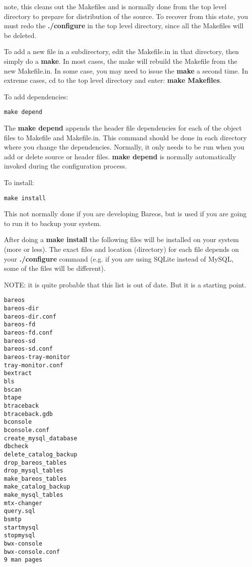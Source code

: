 note, this cleans out the Makefiles and is normally done from the top level
directory to prepare for distribution of the source. To recover from this
state, you must redo the {\bf ./configure} in the top level directory, since
all the Makefiles will be deleted.

To add a new file in a subdirectory, edit the Makefile.in in that directory,
then simply do a {\bf make}. In most cases, the make will rebuild the Makefile
from the new Makefile.in. In some case, you may need to issue the {\bf make} a
second time. In extreme cases, cd to the top level directory and enter: {\bf
make Makefiles}.

To add dependencies:

\footnotesize
\begin{verbatim}
make depend
\end{verbatim}
\normalsize

The {\bf make depend} appends the header file dependencies for each of the
object files to Makefile and Makefile.in. This command should be done in each
directory where you change the dependencies. Normally, it only needs to be run
when you add or delete source or header files. {\bf make depend} is normally
automatically invoked during the configuration process.

To install:

\footnotesize
\begin{verbatim}
make install
\end{verbatim}
\normalsize

This not normally done if you are developing Bareos, but is used if you are
going to run it to backup your system.

After doing a {\bf make install} the following files will be installed on your
system (more or less). The exact files and location (directory) for each file
depends on your {\bf ./configure} command (e.g. if you are using SQLite instead
of MySQL, some of the files will be different).

NOTE: it is quite probable that this list is out of date.  But it is a
starting point.

\footnotesize
\begin{verbatim}
bareos
bareos-dir
bareos-dir.conf
bareos-fd
bareos-fd.conf
bareos-sd
bareos-sd.conf
bareos-tray-monitor
tray-monitor.conf
bextract
bls
bscan
btape
btraceback
btraceback.gdb
bconsole
bconsole.conf
create_mysql_database
dbcheck
delete_catalog_backup
drop_bareos_tables
drop_mysql_tables
make_bareos_tables
make_catalog_backup
make_mysql_tables
mtx-changer
query.sql
bsmtp
startmysql
stopmysql
bwx-console
bwx-console.conf
9 man pages
\end{verbatim}
\normalsize


